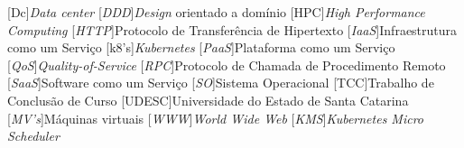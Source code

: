 \pretextualchapter{\listadesiglasname}
\begin{acronym}
    \large
	[Dc]{\it Data center}
	[\textit{DDD}]{\textit{Design} orientado a domínio}
	[HPC]{\textit{High Performance Computing}}
	[\textit{HTTP}]{Protocolo de Transferência de Hipertexto}
	[\textit{IaaS}]{Infraestrutura como um Serviço}
	[k8's]{\textit{Kubernetes}}
	[\textit{PaaS}]{Plataforma como um Serviço}
	[\textit{QoS}]{\textit{Quality-of-Service}}
	[\textit{RPC}]{Protocolo de Chamada de Procedimento Remoto}
	[\textit{SaaS}]{Software como um Serviço}
	[\textit{SO}]{Sistema Operacional}
	[TCC]{Trabalho de Conclusão de Curso}
	[UDESC]{Universidade do Estado de Santa Catarina}
	[\textit{MV's}]{Máquinas virtuais}
	[\textit{WWW}]{\textit{World Wide Web}}
	[\textit{KMS}]{\textit{Kubernetes Micro Scheduler}}
\end{acronym}
\cleardoublepage
